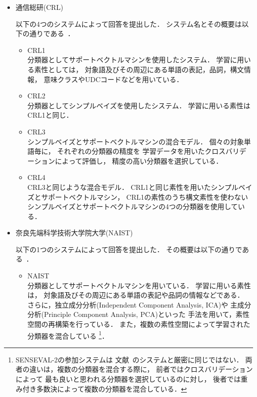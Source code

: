 \begin{itemize}
\item 通信総研(CRL)

  以下の4つのシステムによって回答を提出した．
  システム名とその概要は以下の通りである~\cite{murata:01:a}．

  \begin{itemize}
  \item CRL1\\
    分類器としてサポートベクトルマシンを使用したシステム．
    学習に用いる素性としては，
    対象語及びその周辺にある単語の表記，品詞，構文情報，
    意味クラスやUDCコードなどを用いている．
  \item CRL2\\
    分類器としてシンプルベイズを使用したシステム．
    学習に用いる素性はCRL1と同じ．
  \item CRL3\\
    シンプルベイズとサポートベクトルマシンの混合モデル．
    個々の対象単語毎に，
    それぞれの分類器の精度を
    学習データを用いたクロスバリデーションによって評価し，
    精度の高い分類器を選択している．
  \item CRL4\\
    CRL3と同じような混合モデル．
    CRL1と同じ素性を用いたシンプルベイズとサポートベクトルマシン，
    CRL1の素性のうち構文素性を使わない
    シンプルベイズとサポートベクトルマシンの4つの分類器を使用している．
  \end{itemize}

\item 奈良先端科学技術大学院大学(NAIST)

  以下の1つのシステムによって回答を提出した．
  その概要は以下の通りである~\cite{takamura:01:a}．

  \begin{itemize}
  \item NAIST\\
    分類器としてサポートベクトルマシンを用いている．
    学習に用いる素性は，
    対象語及びその周辺にある単語の表記や品詞の情報などである．
    さらに，独立成分分析(Independent Component Analysis, ICA)や
    主成分分析(Principle  Component Analysis, PCA)といった
    手法を用いて，素性空間の再構築を行っている．
    また，複数の素性空間によって学習された分類器を混合している
    \footnote{
      SENSEVAL-2の参加システムは
      文献~\cite{takamura:01:a}のシステムと厳密に同じではない．
      両者の違いは，複数の分類器を混合する際に，
      前者ではクロスバリデーションによって
      最も良いと思われる分類器を選択しているのに対し，
      後者では重み付き多数決によって複数の分類器を混合している．
      }．
  \end{itemize}


\end{itemize}
